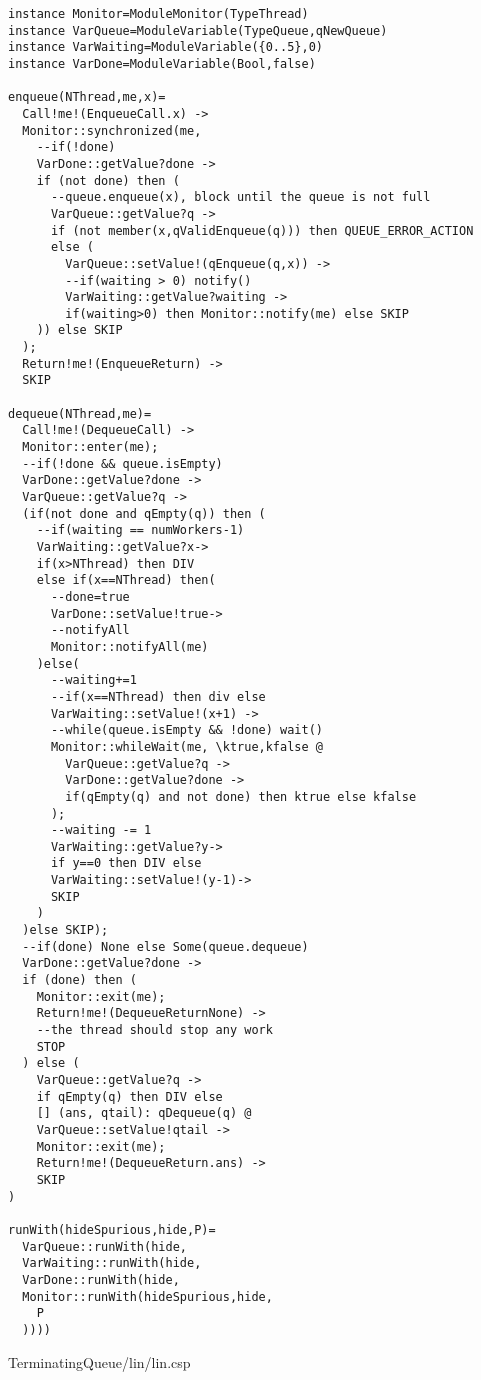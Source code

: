 \begin{lstlisting}
instance Monitor=ModuleMonitor(TypeThread)
instance VarQueue=ModuleVariable(TypeQueue,qNewQueue)
instance VarWaiting=ModuleVariable({0..5},0)
instance VarDone=ModuleVariable(Bool,false)

enqueue(NThread,me,x)=
  Call!me!(EnqueueCall.x) ->
  Monitor::synchronized(me,
    --if(!done)
    VarDone::getValue?done ->
    if (not done) then (
      --queue.enqueue(x), block until the queue is not full
      VarQueue::getValue?q ->
      if (not member(x,qValidEnqueue(q))) then QUEUE_ERROR_ACTION
      else (
        VarQueue::setValue!(qEnqueue(q,x)) ->
        --if(waiting > 0) notify()
        VarWaiting::getValue?waiting ->
        if(waiting>0) then Monitor::notify(me) else SKIP
    )) else SKIP
  );
  Return!me!(EnqueueReturn) ->
  SKIP
  
dequeue(NThread,me)=
  Call!me!(DequeueCall) ->
  Monitor::enter(me);
  --if(!done && queue.isEmpty)
  VarDone::getValue?done ->
  VarQueue::getValue?q ->
  (if(not done and qEmpty(q)) then (
    --if(waiting == numWorkers-1)
    VarWaiting::getValue?x->
    if(x>NThread) then DIV
    else if(x==NThread) then(
      --done=true
      VarDone::setValue!true->
      --notifyAll
      Monitor::notifyAll(me)
    )else(
      --waiting+=1
      --if(x==NThread) then div else
      VarWaiting::setValue!(x+1) ->
      --while(queue.isEmpty && !done) wait()
      Monitor::whileWait(me, \ktrue,kfalse @
        VarQueue::getValue?q ->
        VarDone::getValue?done ->
        if(qEmpty(q) and not done) then ktrue else kfalse
      );
      --waiting -= 1
      VarWaiting::getValue?y->
      if y==0 then DIV else 
      VarWaiting::setValue!(y-1)->
      SKIP
    )
  )else SKIP);
  --if(done) None else Some(queue.dequeue)
  VarDone::getValue?done ->
  if (done) then (
    Monitor::exit(me);
    Return!me!(DequeueReturnNone) ->
    --the thread should stop any work
    STOP
  ) else (
    VarQueue::getValue?q ->
    if qEmpty(q) then DIV else
    [] (ans, qtail): qDequeue(q) @
    VarQueue::setValue!qtail ->
    Monitor::exit(me);
    Return!me!(DequeueReturn.ans) ->
    SKIP
)

runWith(hideSpurious,hide,P)=
  VarQueue::runWith(hide,
  VarWaiting::runWith(hide,
  VarDone::runWith(hide,
  Monitor::runWith(hideSpurious,hide,
    P
  ))))
\end{lstlisting}
TerminatingQueue/lin/lin.csp
